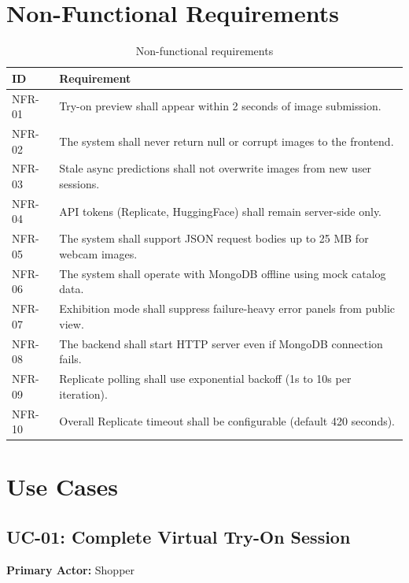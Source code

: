 \section{Non-Functional Requirements}
\label{sec:nonfunctional-requirements}

\begin{table}[H]
  \centering
  \caption{Non-functional requirements}
  \label{tab:nfr}
  \small
  \begin{tabular}{@{}p{1.5cm}p{12cm}@{}}
    \toprule
    \textbf{ID} & \textbf{Requirement} \\
    \midrule
    NFR-01 & Try-on preview shall appear within 2 seconds of image submission. \\
    NFR-02 & The system shall never return null or corrupt images to the frontend. \\
    NFR-03 & Stale async predictions shall not overwrite images from new user sessions. \\
    NFR-04 & API tokens (Replicate, HuggingFace) shall remain server-side only. \\
    NFR-05 & The system shall support JSON request bodies up to 25 MB for webcam images. \\
    NFR-06 & The system shall operate with MongoDB offline using mock catalog data. \\
    NFR-07 & Exhibition mode shall suppress failure-heavy error panels from public view. \\
    NFR-08 & The backend shall start HTTP server even if MongoDB connection fails. \\
    NFR-09 & Replicate polling shall use exponential backoff (1s to 10s per iteration). \\
    NFR-10 & Overall Replicate timeout shall be configurable (default 420 seconds). \\
    \bottomrule
  \end{tabular}
\end{table}

\section{Use Cases}
\label{sec:use-cases}

\subsection{UC-01: Complete Virtual Try-On Session}

\textbf{Primary Actor:} Shopper

